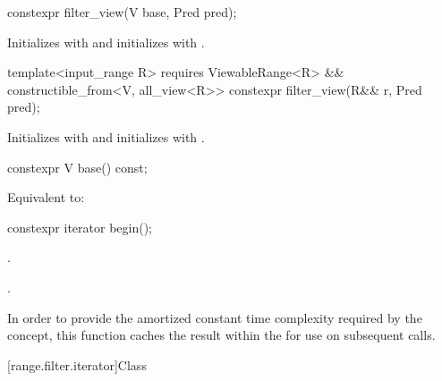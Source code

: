 %
\begin{itemdecl}
constexpr filter_view(V base, Pred pred);
\end{itemdecl}

\begin{itemdescr}
\pnum
\effects Initializes  with  and initializes
 with .
\end{itemdescr}

%
\begin{itemdecl}
template<input_range R>
  requires ViewableRange<R> && constructible_from<V, all_view<R>>
constexpr filter_view(R&& r, Pred pred);
\end{itemdecl}

\begin{itemdescr}
\pnum
\effects Initializes  with 
and initializes  with .
\end{itemdescr}

%
\begin{itemdecl}
constexpr V base() const;
\end{itemdecl}

\begin{itemdescr}
\pnum
\effects Equivalent to: 
\end{itemdescr}

%
\begin{itemdecl}
constexpr iterator begin();
\end{itemdecl}

\begin{itemdescr}
\pnum
\expects
{}.

\pnum
\returns
{}.

\pnum
\remarks In order to provide the amortized constant time complexity required by
the  concept, this function caches the result within the
 for use on subsequent calls.
\end{itemdescr}

[range.filter.iterator]{Class }


